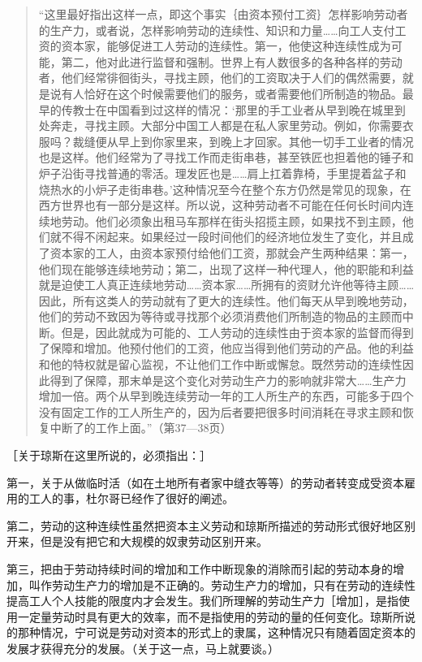 \begin{quote}{“这里最好指出这样一点，即这个事实｛由资本预付工资｝怎样影响劳动者的生产力，或者说，怎样影响劳动的连续性、知识和力量……向工人支付工资的资本家，能够促进工人劳动的连续性。第一，他使这种连续性成为可能，第二，他对此进行监督和强制。世界上有人数很多的各种各样的劳动者，他们经常徘徊街头，寻找主顾，他们的工资取决于人们的偶然需要，就是说有人恰好在这个时候需要他们的服务，或者需要他们所制造的物品。最早的传教士在中国看到过这样的情况：‘那里的手工业者从早到晚在城里到处奔走，寻找主顾。大部分中国工人都是在私人家里劳动。例如，你需要衣服吗？裁缝便从早上到你家里来，到晚上才回家。其他一切手工业者的情况也是这样。他们经常为了寻找工作而走街串巷，甚至铁匠也担着他的锤子和炉子沿街寻找普通的零活。理发匠也是……肩上扛着靠椅，手里提着盆子和烧热水的小炉子走街串巷。’这种情况至今在整个东方仍然是常见的现象，在西方世界也有一部分是这样。所以说，这种劳动者不可能在任何长时间内连续地劳动。他们必须象出租马车那样在街头招揽主顾，如果找不到主顾，他们就不得不闲起来。如果经过一段时间他们的经济地位发生了变化，并且成了资本家的工人，由资本家预付给他们工资，那就会产生两种结果：第一，他们现在能够连续地劳动；第二，出现了这样一种代理人，他的职能和利益就是迫使工人真正连续地劳动……资本家……所拥有的资财允许他等待主顾……因此，所有这类人的劳动就有了更大的连续性。他们每天从早到晚地劳动，他们的劳动不致因为等待或寻找那个必须消费他们所制造的物品的主顾而中断。但是，因此就成为可能的、工人劳动的连续性由于资本家的监督而得到了保障和增加。他预付他们的工资，他应当得到他们劳动的产品。他的利益和他的特权就是留心监视，不让他们工作中断或懈怠。既然劳动的连续性因此得到了保障，那末单是这个变化对劳动生产力的影响就非常大……生产力增加一倍。两个从早到晚连续劳动一年的工人所生产的东西，可能多于四个没有固定工作的工人所生产的，因为后者要把很多时间消耗在寻求主顾和恢复中断了的工作上面。”（第37—38页）}\end{quote}

［关于琼斯在这里所说的，必须指出：］

第一，关于从做临时活（如在土地所有者家中缝衣等等）的劳动者转变成受资本雇用的工人的事，杜尔哥已经作了很好的阐述。

第二，劳动的这种连续性虽然把资本主义劳动和琼斯所描述的劳动形式很好地区别开来，但是没有把它和大规模的奴隶劳动区别开来。

第三，把由于劳动持续时间的增加和工作中断现象的消除而引起的劳动本身的增加，叫作劳动生产力的增加是不正确的。劳动生产力的增加，只有在劳动的连续性提高工人个人技能的限度内才会发生。我们所理解的劳动生产力［增加］，是指使用一定量劳动时具有更大的效率，而不是指使用的劳动的量的任何变化。琼斯所说的那种情况，宁可说是劳动对资本的形式上的隶属，这种情况只有随着固定资本的发展才获得充分的发展。（关于这一点，马上就要谈。）

